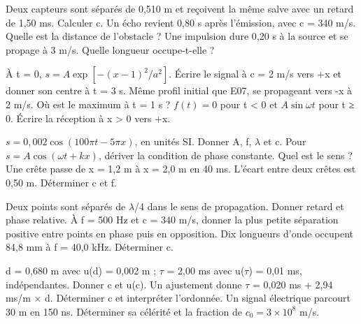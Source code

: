 Deux capteurs sont séparés de 0,510 m et reçoivent la même salve avec un retard de 1,50 ms. Calculer c.
Un écho revient 0,80 s après l’émission, avec c = 340 m/s. Quelle est la distance de l’obstacle ?
Une impulsion dure 0,20 s à la source et se propage à 3 m/s. Quelle longueur occupe-t-elle ?


À t = 0, $s=A\exp[-(x-1)^2/a^2]$. Écrire le signal à c = 2 m/s vers +x et donner son centre à t = 3 s.
Même profil initial que E07, se propageant vers -x à 2 m/s. Où est le maximum à t = 1 s ?
$f(t)=0$ pour t < 0 et $A\sin\omega t$ pour t ≥ 0. Écrire la réception à x > 0 vers +x.


$s=0{,}002\cos(100\pi t-5\pi x)$, en unités SI. Donner A, f, \ensuremath{\lambda} et c.
Pour $s=A\cos(\omega t+kx)$, dériver la condition de phase constante. Quel est le sens ?
Une crête passe de x = 1,2 m à x = 2,0 m en 40 ms. L’écart entre deux crêtes est 0,50 m. Déterminer c et f.


Deux points sont séparés de \ensuremath{\lambda}/4 dans le sens de propagation. Donner retard et phase relative.
À f = 500 Hz et c = 340 m/s, donner la plus petite séparation positive entre points en phase puis en opposition.
Dix longueurs d’onde occupent 84,8 mm à f = 40,0 kHz. Déterminer c.


d = 0,680 m avec u(d) = 0,002 m ; \ensuremath{\tau} = 2,00 ms avec u(\ensuremath{\tau}) = 0,01 ms, indépendantes. Donner c et u(c).
Un ajustement donne \ensuremath{\tau} = 0,020 ms + 2,94 ms/m × d. Déterminer c et interpréter l’ordonnée.
Un signal électrique parcourt 30 m en 150 ns. Déterminer sa célérité et la fraction de $c_0=3\times10^8$ m/s.


